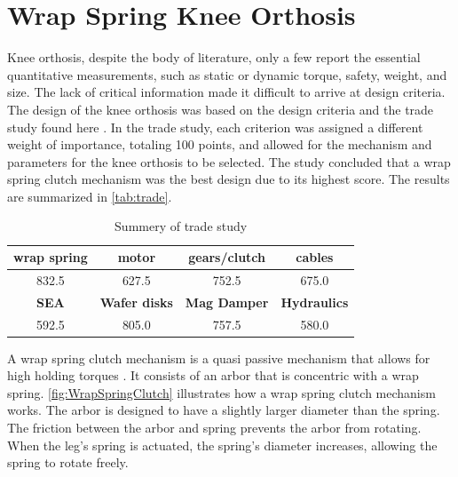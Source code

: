 
\section{Wrap Spring Knee Orthosis}
\label{sec:knee}


Knee orthosis, despite the body of literature, only a few report the essential quantitative measurements, such as static or dynamic torque, safety, weight, and size. The lack of critical information made it difficult to arrive at design criteria. The design of the knee orthosis was based on the design criteria and the trade study found here \cite{subra2020design}. In the trade study, each criterion was assigned a different weight of importance, totaling 100 points, and allowed for the mechanism and parameters for the knee orthosis to be selected. The study concluded that a wrap spring clutch mechanism was the best design due to its highest score. The results are summarized in \autoref{tab:trade}.


\begin{table}[h!]
  \begin{center}
    \begin{tabular}{c|c|c|c} %
      \textbf{wrap spring} & \textbf{motor} & \textbf{gears/clutch} & \textbf{cables} \\
      \hline \hline
      832.5 & 627.5 & 752.5 & 675.0 \\
      \hline
      \textbf{SEA}  & \textbf{Wafer disks}  & \textbf{Mag Damper} & \textbf{Hydraulics} \\
      \hline \hline
      592.5 & 805.0 & 757.5 & 580.0\\
    \end{tabular}
  \end{center}
      \caption[Knee Trade Study]{Summery of trade study}
    \label{tab:trade}
\end{table}


A wrap spring clutch mechanism is a quasi passive mechanism that allows for high holding torques \cite{irby1999optimization} \cite{tung2013design}. It consists of an arbor that is concentric with a wrap spring. \autoref{fig:WrapSpringClutch} illustrates how a wrap spring clutch mechanism works. The arbor is designed to have a slightly larger diameter than the spring. The friction between the arbor and spring prevents the arbor from rotating. When the leg's spring is actuated, the spring's diameter increases, allowing the spring to rotate freely. 

